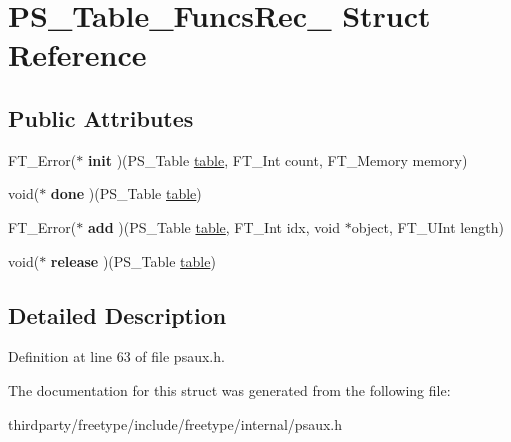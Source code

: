 \hypertarget{struct_p_s___table___funcs_rec__}{}\section{P\+S\+\_\+\+Table\+\_\+\+Funcs\+Rec\+\_\+ Struct Reference}
\label{struct_p_s___table___funcs_rec__}
\subsection*{Public Attributes}
\begin{DoxyCompactItemize}
\item 
\mbox{\label{struct_p_s___table___funcs_rec___a5ac6b9ff3cb3bec352235cecea5c6def}} 
F\+T\+\_\+\+Error($\ast$ {\bfseries init} )(P\+S\+\_\+\+Table \hyperlink{classtable}{table}, F\+T\+\_\+\+Int count, F\+T\+\_\+\+Memory memory)
\item 
\mbox{\label{struct_p_s___table___funcs_rec___ae358c8c8f5ae26f58c136993ddac6276}} 
void($\ast$ {\bfseries done} )(P\+S\+\_\+\+Table \hyperlink{classtable}{table})
\item 
\mbox{\label{struct_p_s___table___funcs_rec___a24dfeaaf0cec2115c186ea4f2a9cc4aa}} 
F\+T\+\_\+\+Error($\ast$ {\bfseries add} )(P\+S\+\_\+\+Table \hyperlink{classtable}{table}, F\+T\+\_\+\+Int idx, void $\ast$object, F\+T\+\_\+\+U\+Int length)
\item 
\mbox{\label{struct_p_s___table___funcs_rec___aa593cc617f0caf908d7d7f3dd770fab5}} 
void($\ast$ {\bfseries release} )(P\+S\+\_\+\+Table \hyperlink{classtable}{table})
\end{DoxyCompactItemize}


\subsection{Detailed Description}


Definition at line 63 of file psaux.\+h.



The documentation for this struct was generated from the following file\+:\begin{DoxyCompactItemize}
\item 
thirdparty/freetype/include/freetype/internal/psaux.\+h\end{DoxyCompactItemize}
